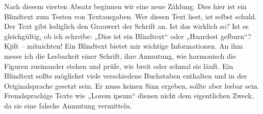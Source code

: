 \documentclass[class=scrbook, crop=false]{standalone}
\begin{document}
{    Nach diesem vierten Absatz beginnen wir eine neue Zählung. Dies hier ist ein Blindtext zum Testen von Textausgaben. Wer diesen Text liest, ist selbst schuld. Der Text gibt lediglich den Grauwert der Schrift an. Ist das wirklich so? Ist es gleichgültig, ob ich schreibe: „Dies ist ein Blindtext“ oder „Huardest gefburn“? Kjift – mitnichten! Ein Blindtext bietet mir wichtige Informationen. An ihm messe ich die Lesbarkeit einer Schrift, ihre Anmutung, wie harmonisch die Figuren zueinander stehen und prüfe, wie breit oder schmal sie läuft. Ein Blindtext sollte möglichst viele verschiedene Buchstaben enthalten und in der Originalsprache gesetzt sein. Er muss keinen Sinn ergeben, sollte aber lesbar sein. Fremdsprachige Texte wie „Lorem ipsum“ dienen nicht dem eigentlichen Zweck, da sie eine falsche Anmutung vermitteln.
}
\end{document}
